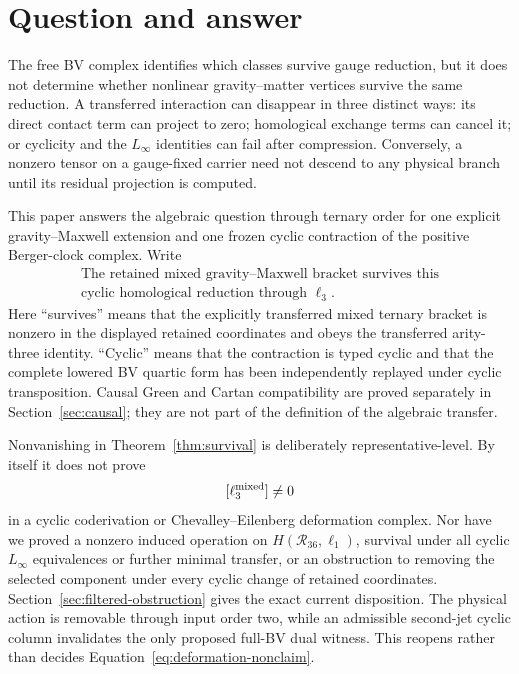 \documentclass[11pt]{article}
\theoremstyle{definition}
\theoremstyle{remark}
\newcommand{\cR}{\mathcal R}
\begin{document}
\tableofcontents

\section{Question and answer}\label{sec:intro}

The free BV complex identifies which classes survive gauge reduction, but it
does not determine whether nonlinear gravity--matter vertices survive the
same reduction.  A transferred interaction can disappear in three distinct
ways: its direct contact term can project to zero; homological exchange terms
can cancel it; or cyclicity and the $L_\infty$ identities can fail after
compression.  Conversely, a nonzero tensor on a gauge-fixed carrier need not
descend to any physical branch until its residual projection is computed.

This paper answers the algebraic question through ternary order for one
explicit gravity--Maxwell extension and one frozen cyclic contraction of the
positive Berger-clock complex.  Write
\begin{equation}\label{eq:headline}
 \boxed{\begin{gathered}
 \text{The retained mixed gravity--Maxwell bracket survives this}\\
 \text{cyclic homological reduction through }\ell_3.
 \end{gathered}}
\end{equation}
Here ``survives'' means that the explicitly transferred mixed ternary bracket
is nonzero in the displayed retained coordinates and obeys the transferred
arity-three identity.  ``Cyclic'' means that the contraction is typed cyclic
and that the complete lowered BV quartic form has been independently replayed
under cyclic transposition.  Causal Green and Cartan compatibility are proved
separately in Section~\ref{sec:causal}; they are not part of the definition of
the algebraic transfer.

Nonvanishing in Theorem~\ref{thm:survival} is deliberately
representative-level.  By itself it does not prove
\begin{equation}\label{eq:deformation-nonclaim}
 [\ell_3^{\rm mixed}]\neq0
\end{equation}
in a cyclic coderivation or Chevalley--Eilenberg deformation complex.  Nor
have we proved a nonzero induced operation on $H(\cR_{36},\ell_1)$, survival
under all cyclic $L_\infty$ equivalences or further minimal transfer, or an
obstruction to removing the selected component under every cyclic change of
retained coordinates.  Section~\ref{sec:filtered-obstruction} gives the exact
current disposition.  The physical action is removable through input order
two, while an admissible second-jet cyclic column invalidates the only
proposed full-BV dual witness.  This reopens rather than decides
Equation~\eqref{eq:deformation-nonclaim}.
\end{document}
